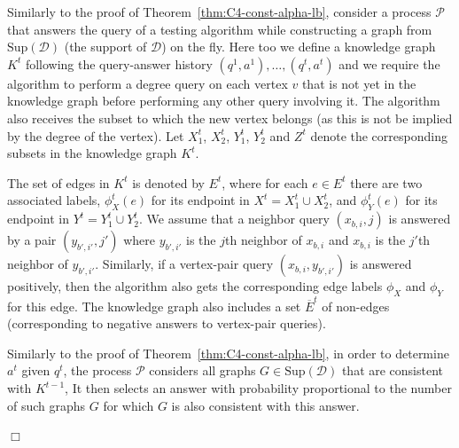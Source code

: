 \documentclass{article}
\newcommand{\calD}{{\mathcal{D}}}
\newcommand{\calP}{{\mathcal{P}}}
\newcommand{\Sup}{\textrm{Sup}}
\newenvironment{proof}{\smallskip\noindent{\bf Proof:}}%
        {\hspace*{\fill}$\Box$\par}
\newcommand{\commentt}[1]{ {}}
\begin{document}
\begin{proof}
Similarly to the proof of Theorem~\ref{thm:C4-const-alpha-lb}, consider a process $\calP$ that answers the query of a testing algorithm while constructing a graph from $\Sup(\calD)$ (the support of $\calD$) on the fly. Here too we define a knowledge graph $K^t$ following the query-answer history $(q^1,a^1),\dots,(q^t,a^t)$ and we require the algorithm to perform a degree query on each vertex $v$ that is not yet in the knowledge graph before performing any other query involving it. The algorithm also receives the subset to which the new vertex belongs (as this is not be implied by the degree of the vertex). Let $X_1^t$, $X_2^t$, $Y_1^t$, $Y_2^t$ and $Z^t$ denote the corresponding subsets in the knowledge graph $K^t$. %

The set of edges in $K^t$ is denoted by $E^t$, where for each $e\in E^t$ there are two associated labels,
$\phi^t_X(e)$ for its endpoint in $X^t = X_1^t \cup X_2^t$, and $\phi^t_Y(e)$ for its endpoint in $Y^t = Y_1^t \cup Y_2^t$.
 We assume that a neighbor query $(x_{b,i},j)$ is answered by a pair $(y_{b',i'},j')$ where
$y_{b',i'}$ is the $j$th neighbor of $x_{b,i}$ and $x_{b,i}$ is the $j'$th neighbor of $y_{b',i'}$. Similarly, if a vertex-pair query $(x_{b,i},y_{b',i'})$ is answered positively, then the algorithm also gets the corresponding edge labels $\phi_X$ and $\phi_Y$ for this edge. The knowledge graph also includes a set $\overline{E}^t$ of non-edges (corresponding to negative answers to vertex-pair queries).

Similarly to
the proof of Theorem~\ref{thm:C4-const-alpha-lb}, in order to
determine $a^t$ given $q^t$,
the process $\calP$ considers all graphs  $G\in \Sup(\calD)$
that are consistent with $K^{t-1}$,
It then selects an answer with probability proportional to the number of such graphs $G$ for which %
$G$ is also consistent with this answer.


\end{proof}
\end{document}
